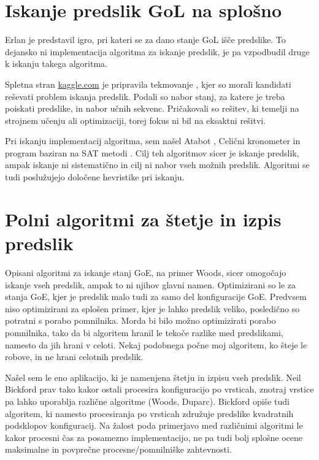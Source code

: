 \documentclass[12pt,a4paper,openany,twoside]{book}
\begin{document}
\section{Iskanje predslik GoL na splošno}

Erlan \cite{Erlan2012} je predstavil igro, pri kateri se za dano stanje
GoL išče predslike. To dejansko ni implementacija algoritma za iskanje predslik,
je pa vzpodbudil druge k iskanju takega algoritma.

Spletna stran \url{kaggle.com} je pripravila tekmovanje \cite{kaggle2013},
kjer so morali kandidati reševati problem iskanja predslik. Podali so
nabor stanj, za katere je treba poiskati predslike, in nabor učnih sekvenc.
Pričakovali so rešitev, ki temelji na strojnem učenju ali optimizaciji,
torej fokus ni bil na eksaktni rešitvi.

Pri iskanju implementacij algoritma, sem našel Atabot \cite{Borah2013},
Celični kronometer \cite{Duxbury2013} in program baziran na SAT metodi \cite{Pigorsch2015}.
Cilj teh algoritmov sicer je iskanje predslik, ampak iskanje ni sistematično
in cilj ni nabor vseh možnih predslik.
Algoritmi se tudi poslužujejo določene hevristike pri iskanju.

\section{Polni algoritmi za štetje in izpis predslik}

Opisani algoritmi za iskanje stanj GoE, na primer Woods,
sicer omogočajo iskanje vseh predslik, ampak to ni njihov glavni namen.
Optimizirani so le za stanja GoE, kjer je predslik malo tudi za samo del konfiguracije GoE.
Predvsem niso optimizirani za splošen primer, kjer je lahko predslik veliko,
posledično so potratni s porabo pomnilnika.
Morda bi bilo možno optimizirati porabo pomnilnika,
tako da bi algoritem hranil le tekoče razlike med predslikami, namesto da jih hrani v celoti.
Nekaj podobnega počne moj algoritem, ko šteje le robove, in ne hrani celotnih predslik.

Našel sem le eno aplikacijo, ki je namenjena štetju in izpisu vseh predslik.
Neil Bickford \cite{Bickford2012} prav tako kakor ostali procesira konfiguracijo
po vrsticah, znotraj vrstice pa lahko uporablja različne algoritme (Woods, Duparc).
Bickford opiše tudi algoritem, ki namesto procesiranja po vrsticah združuje predslike
kvadratnih podsklopov konfiguracij. Na žalost poda primerjavo med različnimi algoritmi
le kakor procesni čas za posamezno implementacijo, ne pa tudi bolj splošne
ocene maksimalne in povprečne procesne/pomnilniške zahtevnosti.
\end{document}
